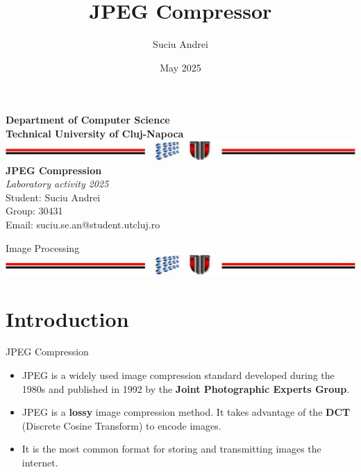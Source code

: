 \documentclass[10pt]{beamer}
\title{JPEG Compressor}
\author{Suciu Andrei}
\date{May 2025}
\begin{document}
\begin{frame}
    \setlength{\parindent}{0pt}
        \begin{center}
            \vspace{0.2cm}
            \textbf{\large Department of Computer Science} \\[0.2cm]
            \textbf{\large Technical University of Cluj-Napoca} \\[0.2cm]
            \includegraphics[width=1\textwidth]{utLogo.png} \\[0.5cm]

            \textbf{JPEG Compression} \\
            \textit{Laboratory activity 2025} \\[0.5cm]

            Student: Suciu Andrei \\
            Group: 30431 \\
            Email: suciu.se.an@student.utcluj.ro\\[1cm]

            \vfill

            Image Processing \\[0.2cm]
            \includegraphics[width=1\textwidth]{utLogo.png} \\[0.2cm]


        \end{center}
\end{frame}

\begin{frame}
 \tableofcontents
\end{frame}

\section{Introduction}

\begin{frame}{JPEG Compression}
    \vspace{20pt}
    \begin{itemize}
     \item JPEG is a widely used image compression standard developed during the 1980s and published in 1992 by the \textbf{Joint Photographic Experts Group}.
     \item JPEG is a \textbf{lossy} image compression method. It takes advantage of the \textbf{DCT} (Discrete Cosine Transform) to encode images.
     \item It is the most common format for storing and transmitting images  the internet.
    \end{itemize}

\end{frame}
\end{document}
